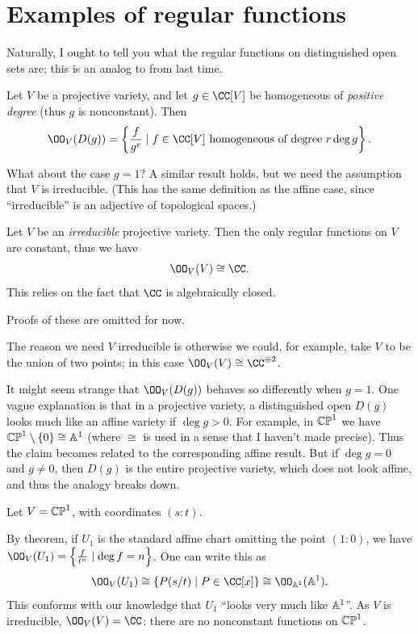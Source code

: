 \section{Examples of regular functions}
Naturally, I ought to tell you what the regular functions
on distinguished open sets are; this is an analog to
 from last time.
\begin{theorem}
	Let $V$ be a projective variety, and let $g \in \CC[V]$ be homogeneous
	of \emph{positive degree} (thus $g$ is nonconstant).
	Then
	\[
		\OO_V(D(g))
		= \left\{ \frac{f}{g^r} \mid
		f \in \CC[V] \text{ homogeneous of degree $r\deg g$}
		\right\}.
	\]
\end{theorem}
What about the case $g = 1$?
A similar result holds, but we need the assumption that $V$ is irreducible.
(This has the same definition as the affine case,
since ``irreducible'' is an adjective of topological spaces.)
\begin{theorem}
	Let $V$ be an \emph{irreducible} projective variety.
	Then the only regular functions on $V$ are constant,
	thus we have \[ \OO_V(V) \cong \CC. \]
	This relies on the fact that $\CC$ is algebraically closed.
\end{theorem}
Proofs of these are omitted for now.

The reason we need $V$ irreducible is otherwise
we could, for example, take $V$ to be the union of two points;
in this case $\OO_V(V) \cong \CC^{\oplus 2}$.

It might seem strange that $\OO_V(D(g))$ behaves so differently
when $g = 1$. One vague explanation is that in a projective variety,
a distinguished open $D(g)$ looks much like an affine variety if $\deg g > 0$.
For example, in $\mathbb{CP}^1$ we have $\mathbb{CP}^1 \setminus \{0\} \cong \mathbb A^1$
(where $\cong$ is used in a sense that I haven't made precise).
Thus the claim becomes related to the corresponding affine result.
But if $\deg g = 0$ and $g \neq 0$, then $D(g)$ is the entire projective variety,
which does not look affine, and thus the analogy breaks down.

\begin{example}
	Let $V = \mathbb{CP}^1$, with coordinates $(s:t)$.
	\begin{enumerate}[(a)]
		\ii By theorem, if $U_1$ is the standard affine chart
		omitting the point $(1:0)$, we have
		$ \OO_V(U_1) = \left\{ \frac{f}{t^n} \mid \deg f = n \right\} $.
		One can write this as
		\[ \OO_V(U_1) \cong \left\{ P(s/t) \mid P \in \CC[x] \right\}
			\cong \OO_{\Aff^1} (\Aff^1). \]
		This conforms with our knowledge that $U_1$
		``looks very much like $\mathbb A^1$''.
		\ii As $V$ is irreducible, $\OO_V(V) = \CC$:
		there are no nonconstant functions on $\mathbb{CP}^1$.
	\end{enumerate}
\end{example}

